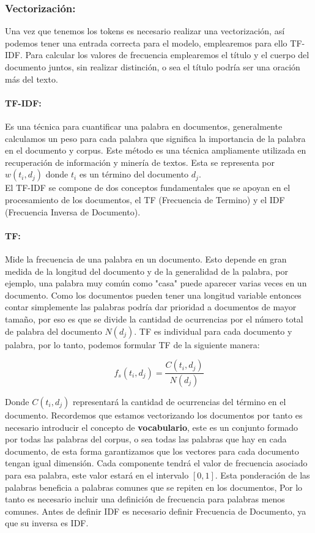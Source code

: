 \documentclass[runningheads,a4paper]{llncs}
\begin{document}
\subsubsection{Vectorización:} Una vez que tenemos los tokens es necesario realizar una vectorización, así podemos tener una entrada correcta para el modelo, emplearemos para ello TF-IDF. Para calcular los valores de frecuencia  emplearemos el título y el cuerpo del documento juntos, sin realizar distinción, o sea el título podría ser una oración más del texto.

\paragraph*{TF-IDF:} Es una técnica para cuantificar una palabra en documentos, generalmente calculamos un peso para cada palabra que significa la importancia de la palabra en el documento y corpus. Este método es una técnica ampliamente utilizada en recuperación de información y minería de textos. Esta se representa por $w(t_i, d_j)$ donde $t_i$ es un término del documento $d_j$. \\

El TF-IDF se compone de dos conceptos fundamentales que se apoyan en el procesamiento de los documentos, el TF (Frecuencia de Termino) y el IDF (Frecuencia Inversa de Documento).

\paragraph*{TF:} Mide la frecuencia de una palabra en un documento. Esto depende en gran medida de la longitud del documento y de la generalidad de la palabra, por ejemplo, una palabra muy común como "casa" puede aparecer varias veces en un documento. Como los documentos pueden tener una longitud variable entonces contar simplemente las palabras podría dar prioridad a documentos de mayor tamaño, por eso es que se divide la cantidad de ocurrencias por el número total de palabra del documento $N(d_j)$. TF es individual para cada documento y palabra, por lo tanto, podemos formular TF de la siguiente manera:

\begin{equation}
	f_s(t_i, d_j) = \frac{C(t_i, d_j)}{N(d_j)}
\end{equation}

Donde $C(t_i, d_j)$ representará la cantidad de ocurrencias del término en el documento. Recordemos que estamos vectorizando los documentos por tanto es necesario introducir el concepto de \textbf{vocabulario}, este es un conjunto formado por todas las palabras del corpus, o sea todas las palabras que hay en cada documento, de esta forma garantizamos que los vectores para cada documento tengan igual dimensión. Cada componente tendrá el valor de frecuencia asociado para esa palabra, este valor estará en el intervalo $[0,1]$. Esta ponderación de las palabras beneficia a palabras comunes que se repiten en los documentos, Por lo tanto es necesario incluir una definición de frecuencia para palabras menos comunes. Antes de definir IDF es necesario definir Frecuencia de Documento, ya que su inversa es IDF.
\end{document}
